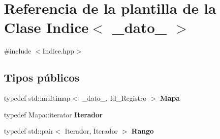 \hypertarget{classIndice}{\section{\-Referencia de la plantilla de la \-Clase \-Indice$<$ \-\_\-dato\-\_\- $>$}
\label{classIndice}
}


{\ttfamily \#include $<$\-Indice.\-hpp$>$}

\subsection*{\-Tipos públicos}
\begin{DoxyCompactItemize}
\item 
\hypertarget{classIndice_abf092d7caf818f0723c052909eb5997c}{typedef std\-::multimap$<$ \-\_\-dato\-\_\-, \*
\-Id\-\_\-\-Registro $>$ {\bfseries \-Mapa}}\label{classIndice_abf092d7caf818f0723c052909eb5997c}

\item 
\hypertarget{classIndice_a9b5f40892f2626ec60fdbc5e0cdd852d}{typedef \-Mapa\-::iterator {\bfseries \-Iterador}}\label{classIndice_a9b5f40892f2626ec60fdbc5e0cdd852d}

\item 
\hypertarget{classIndice_a86759fbc9a5288d56f80a53aa5a2d0c8}{typedef std\-::pair$<$ \-Iterador, \*
\-Iterador $>$ {\bfseries \-Rango}}\label{classIndice_a86759fbc9a5288d56f80a53aa5a2d0c8}

\end{DoxyCompactItemize}
